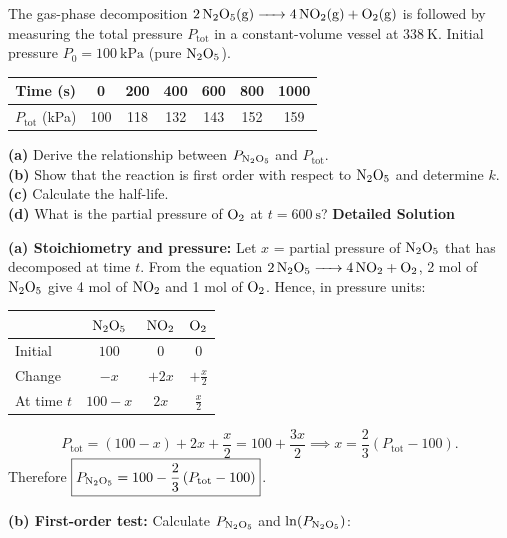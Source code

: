 \documentclass[11pt]{article}
\begin{document}
\begin{exoresolu}
The gas-phase decomposition $\ce{2N2O5(g) -> 4NO2(g) + O2(g)}$ is followed by measuring the total pressure $P_{\text{tot}}$ in a constant-volume vessel at $338\ \mathrm{K}$. Initial pressure $P_0 = 100\ \mathrm{kPa}$ (pure $\ce{N2O5}$).

\begin{center}
\begin{tabular}{|c|cccccc|}\hline
Time (s) & 0 & 200 & 400 & 600 & 800 & 1000 \\ \hline
$P_{\text{tot}}$ (kPa) & 100 & 118 & 132 & 143 & 152 & 159 \\ \hline
\end{tabular}
\end{center}

\textbf{(a)} Derive the relationship between $P_{\ce{N2O5}}$ and $P_{\text{tot}}$. \\
\textbf{(b)} Show that the reaction is first order with respect to $\ce{N2O5}$ and determine $k$. \\
\textbf{(c)} Calculate the half-life. \\
\textbf{(d)} What is the partial pressure of $\ce{O2}$ at $t=600\ \mathrm{s}$?
\tcblower
\textbf{Detailed Solution}

\textbf{(a) Stoichiometry and pressure:} Let $x$ = partial pressure of $\ce{N2O5}$ that has decomposed at time $t$. From the equation $\ce{2N2O5 -> 4NO2 + O2}$, 2 mol of $\ce{N2O5}$ give 4 mol of $\ce{NO2}$ and 1 mol of $\ce{O2}$. Hence, in pressure units:
\begin{center}
\begin{tabular}{|l|ccc|}\hline
 & $\ce{N2O5}$ & $\ce{NO2}$ & $\ce{O2}$ \\ \hline
Initial & $100$ & $0$ & $0$ \\
Change & $-x$ & $+2x$ & $+\tfrac{x}{2}$ \\
At time $t$ & $100 - x$ & $2x$ & $\tfrac{x}{2}$ \\ \hline
\end{tabular}
\end{center}
\[ P_{\text{tot}} = (100 - x) + 2x + \frac{x}{2} = 100 + \frac{3x}{2} \implies x = \frac{2}{3}\left(P_{\text{tot}} - 100\right). \]
Therefore $\boxed{P_{\ce{N2O5}} = 100 - \dfrac{2}{3}\left(P_{\text{tot}} - 100\right)}$.

\textbf{(b) First-order test:} Calculate $P_{\ce{N2O5}}$ and $\ln(P_{\ce{N2O5}})$:


\end{exoresolu}
\end{document}
